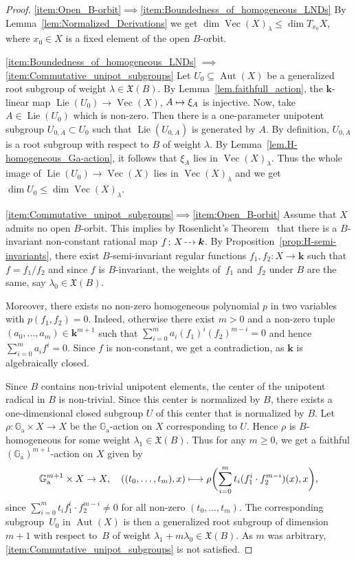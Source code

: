 \documentclass[JEP,XML,SOM,Unicode]{cedram}
\newcommand{\dradpl}{{\hspace*{-2.5mm}\begin{tikzcd}[ampersand replacement=\&,column sep = scriptsize]\mbox{}\ar[r,dashed]\&\mbox{}\end{tikzcd}\hspace*{-2.5mm}}}
\newcommand{\dratst}{{\hspace*{-2.5mm}\begin{tikzcd}[ampersand replacement=\&,column sep = small]\mbox{}\ar[r,dashed]\&\mbox{}\end{tikzcd}\hspace*{-2mm}}}
\let\drascst\dratst
\newcommand{\dra}{\mathchoice{\dradpl}{\dratst}{\drascst}{\drascst}}
\def\mto{\mathchoice{\longmapsto}{\mapsto}{\mapsto}{\mapsto}}
\newcommand{\ra}{\mathrm{a}}
\theoremstyle{plain}
\theoremstyle{definition}
\DeclareMathOperator{\Lie}{Lie}
\DeclareMathOperator{\Aut}{Aut}
\DeclareMathOperator{\Ve}{Vec}
\newcommand{\GG}{\mathbb{G}}
\newcommand{\kk}{{\boldsymbol{k}}}
\begin{document}
\skpt
\begin{proof}
\eqref{item:Open_B-orbit}$\implies$\eqref{item:Boundedness_of_homogeneous_LNDs}
By Lemma~\ref{lem:Normalized_Derivations} we get
$\dim \Ve(X)_{\lambda} \leq \dim T_{x_0} X$, where $x_0 \in X$ is a fixed element
of the open $B$-orbit.

\eqref{item:Boundedness_of_homogeneous_LNDs}
$\implies$\eqref{item:Commutative_unipot_subgroups}
Let $U_0 \subseteq \Aut(X)$
be a generalized root subgroup of weight \hbox{$\lambda \in \mathfrak{X}(B)$}.
By Lemma~\ref{lem.faithfull_action}, the $\kk$-linear map
$\Lie(U_0) \to \Ve(X)$, $A \mto \xi_A$ is injective.
Now, take $A \in \Lie(U_0)$ which is non-zero. Then there is a one-parameter
unipotent subgroup $U_{0, A} \subset U_0$ such that $\Lie(U_{0, A})$ is generated by $A$.
By definition, $U_{0, A}$ is a root subgroup with respect to $B$ of weight $\lambda$.
By Lemma~\ref{lem.H-homogeneous_Ga-action}, it follows that $\xi_A$ lies in $\Ve(X)_{\lambda}$.
Thus the whole image of $\Lie(U_0) \to \Ve(X)$ lies in $\Ve(X)_\lambda$ and we get
$\dim U_0 \leq \dim \Ve(X)_\lambda$.

\eqref{item:Commutative_unipot_subgroups}$\implies$\eqref{item:Open_B-orbit}
Assume that $X$ admits no open $B$-orbit.
This implies by Rosenlicht's Theorem~\cite[Th.\,2]{Ro1956Some-basic-theorem}
that there is a $B$-invariant non-constant
rational map $f \colon X \dra \kk$.
By Proposition~\ref{prop:H-semi-invariants},
there exist $B$-semi-invariant regular functions $f_1, f_2 \colon X \to \kk$
such that $f = f_1 / f_2$ and since $f$ is $B$-invariant, the weights of~$f_1$ and~$f_2$ under $B$ are the same, say $\lambda_0 \in \mathfrak{X}(B)$.

Moreover, there exists no non-zero homogeneous
polynomial $p$ in two variables with $p(f_1, f_2) = 0$. Indeed, otherwise
there exist $m > 0$ and a non-zero tuple $(a_0, \ldots, a_m) \in \kk^{m+1}$ such that
$\sum_{i=0}^m a_i (f_1)^i (f_2)^{m-i} = 0$ and hence
$\sum_{i=0}^m a_i f^i = 0$. Since $f$ is non-constant, we get
a contradiction, as $\kk$ is algebraically closed.

Since $B$ contains non-trivial
unipotent elements, the center of the unipotent radical in $B$ is non-trivial.
Since this center is normalized by $B$, there exists a one-dimensional closed
subgroup $U$ of this center that is normalized by $B$.
Let $\rho \colon \GG_\ra \times X \to X$ be the $\GG_\ra$-action on $X$
corresponding to $U$.
Hence $\rho$ is $B$-homogeneous for some weight $\lambda_1 \in \mathfrak{X}(B)$.
Thus for any $m \geq 0$, we get a faithful $(\GG_\ra)^{m+1}$-action on $X$ given by
\[
\GG_\ra^{m+1} \times X \to X, \quad
((t_0, \ldots, t_m), x) \mto
\rho\biggl(\sum_{i=0}^m t_i (f_1^i \cdot f_2^{m-i})(x), x \biggr),
\]
since $\sum_{i=0}^m t_i f_1^i \cdot f_2^{m-i} \neq 0$ for all non-zero
$(t_0, \ldots, t_m)$.
The corresponding subgroup~$U_0$ in $\Aut(X)$ is then
a generalized root subgroup of dimension $m+1$
with respect to~$B$ of weight $\lambda_1 + m \lambda_0 \in \mathfrak{X}(B)$.
As $m$ was arbitrary, \eqref{item:Commutative_unipot_subgroups} is not satisfied.
\end{proof}
\end{document}
